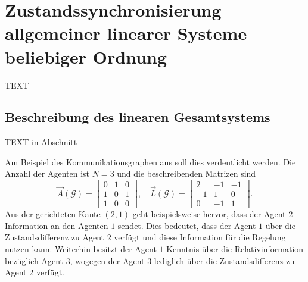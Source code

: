 \chapter{Zustandssynchronisierung allgemeiner linearer Systeme beliebiger Ordnung} \label{ch:zustandssynchro}

TEXT

\section{Beschreibung des linearen Gesamtsystems} \label{sec:systembeschreibung lin}
TEXT in Abschnitt

\begin{bsp} \label{bsp:kommtopo}
	Am Beispiel des Kommunikationsgraphen aus  soll dies verdeutlicht werden. Die Anzahl der Agenten ist $N=3$ und die beschreibenden Matrizen sind
	\begin{equation}
		\vec{A}\left(\mathcal G\right) = \begin{bmatrix}0 & 1 & 0 \\ 1 & 0 & 1 \\ 1 & 0 & 0\end{bmatrix}, \quad \vec{L}\left(\mathcal G\right) = \begin{bmatrix}2 & -1 & -1 \\ -1 & 1 & 0 \\ 0 & -1 & 1\end{bmatrix}.
	\end{equation}
	Aus der gerichteten Kante $(2,1)$ geht beispielsweise hervor, dass der Agent $2$ Information an den Agenten $1$ sendet. Dies bedeutet, dass der Agent $1$ über die Zustandsdifferenz zu Agent $2$ verfügt und diese Information für die Regelung nutzen kann. Weiterhin besitzt der Agent $1$ Kenntnis über die Relativinformation bezüglich Agent $3$, wogegen der Agent $3$ lediglich über die Zustandsdifferenz zu Agent $2$ verfügt.
\end{bsp}

